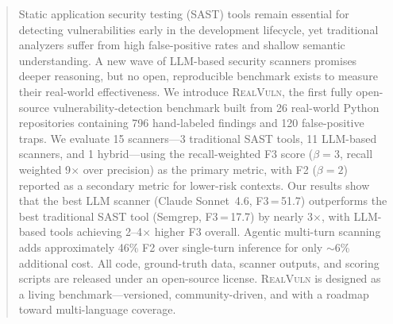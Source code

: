 \begin{abstract}
Static application security testing (SAST) tools remain essential for
detecting vulnerabilities early in the development lifecycle, yet
traditional analyzers suffer from high false-positive rates and shallow
semantic understanding. A new wave of LLM-based security scanners
promises deeper reasoning, but no open, reproducible benchmark exists to
measure their real-world effectiveness. We introduce
\textsc{RealVuln}, the first fully open-source vulnerability-detection
benchmark built from 26 real-world Python repositories containing 796
hand-labeled findings and 120 false-positive traps. We evaluate 15
scanners---3 traditional SAST tools, 11 LLM-based scanners, and 1
hybrid---using the recall-weighted F3 score ($\beta{=}3$, recall weighted 9$\times$ over precision) as the primary metric, with F2 ($\beta{=}2$) reported as a secondary metric for lower-risk contexts. Our
results show that the best LLM scanner (Claude Sonnet~4.6, F3\,=\,51.7)
outperforms the best traditional SAST tool (Semgrep, F3\,=\,17.7) by
nearly 3$\times$, with LLM-based tools achieving 2--4$\times$ higher F3
overall. Agentic multi-turn scanning adds approximately 46\% F2 over
single-turn inference for only ${\sim}$6\% additional cost. All code,
ground-truth data, scanner outputs, and scoring scripts are released
under an open-source license. \textsc{RealVuln} is designed as a living
benchmark---versioned, community-driven, and with a roadmap toward
multi-language coverage.
\end{abstract}
